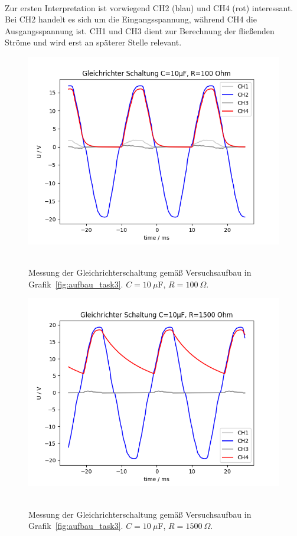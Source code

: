\documentclass{article}
\begin{document}
~

Zur ersten Interpretation ist vorwiegend CH2 (blau) und CH4 (rot) interessant. Bei CH2 handelt es sich um die Eingangsspannung, während CH4 die Ausgangsspannung ist. CH1 und CH3 dient zur Berechnung der fließenden Ströme und wird erst an späterer Stelle relevant.

\begin{figure}[H]
\caption{Messung der Gleichrichterschaltung gemäß Versuchsaufbau in Grafik~\ref{fig:aufbau_task3}. $C=10~\mu$F, $R=100~\Omega$.}
\label{fig:grafik_task3_10_100}
{\centering
\includegraphics[scale=0.6]{bilder/task3_10mu_R100.png}
~
}
\end{figure}

\begin{figure}[H]
\caption{Messung der Gleichrichterschaltung gemäß Versuchsaufbau in Grafik~\ref{fig:aufbau_task3}. $C=10~\mu$F, $R=1500~\Omega$.}
\label{fig:grafik_task3_10_1500}
{\centering
\includegraphics[scale=0.6]{bilder/task3_10mu_R1500.png}
~
}
\end{figure}
\end{document}
